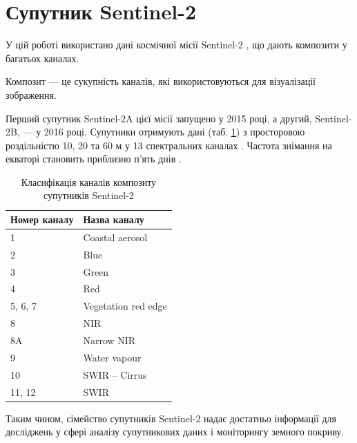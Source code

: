 \section{Супутник Sentinel-2}

У цій роботі використано дані космічної місії %
Sentinel-2 \cite{ref1,ref2}, що дають
композити у багатьох каналах.

Композит --- це сукупність каналів, які %
використовуються для візуалізації зображення.

Перший супутник Sentinel-2A цієї місії запущено у 2015 %
році, а другий, Sentinel-2B, ---
у 2016 році.  Супутники отримують дані (таб. \ref{tab:sentinel_table}) з %
просторовою роздільністю 10, 20 та 60 м у 13
спектральних каналах \cite{ref16}.  Частота знімання на %
екваторі становить приблизно п'ять днів
\cite{ref16}.

\begin{table}[H]
    \begin{center}
        \caption{Класифікація каналів композиту супутників Sentinel-2}
        \label{tab:sentinel_table}
        \begin{tabular}{|p{1.5in} | p{1.8in} |}
            \hline
            \textbf{ Номер каналу} & \textbf{ Назва каналу} \\
            \hline
            1             & Coastal aerosol             \\
            2             & Blue                        \\
            3             & Green                       \\
            4             & Red                         \\
            5, 6, 7       & Vegetation red edge         \\
            8             & NIR                         \\
            8A            & Narrow NIR                  \\
            9             & Water vapour                \\
            10            & SWIR – Cirrus               \\
            11, 12        & SWIR                        \\
            \hline
        \end{tabular}
    \end{center}
\end{table}


Таким чином, сімейство супутників Sentinel-2 надає %
достатньо інформації для досліджень у
сфері аналізу супутникових даних і моніторингу %
земного покриву.
